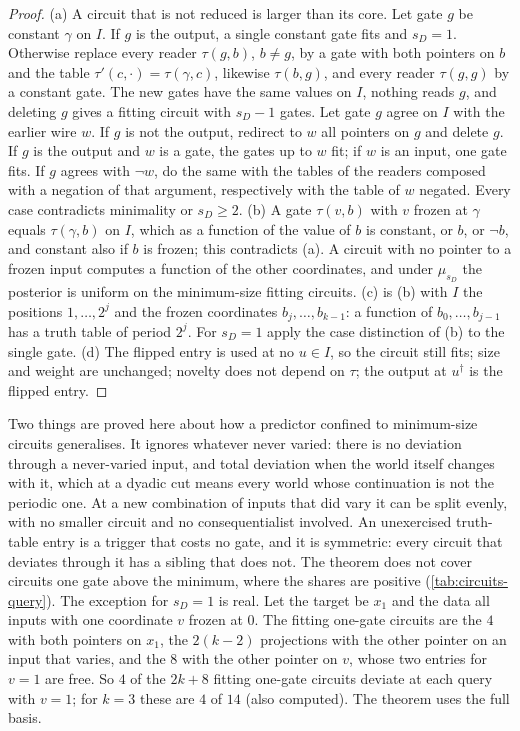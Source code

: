\begin{proof}
(a) A circuit that is not reduced is larger than its core. Let gate $g$ be constant $\gamma$ on $I$. If $g$ is
the output, a single constant gate fits and $s_D=1$. Otherwise replace every reader $\tau(g,b)$, $b\ne g$, by
a gate with both pointers on $b$ and the table $\tau'(c,\cdot)=\tau(\gamma,c)$, likewise $\tau(b,g)$, and
every reader $\tau(g,g)$ by a constant gate. The new gates have the same values on $I$, nothing reads $g$, and
deleting $g$ gives a fitting circuit with $s_D-1$ gates. Let gate $g$ agree on $I$ with the earlier wire $w$.
If $g$ is not the output, redirect to $w$ all pointers on $g$ and delete $g$. If $g$ is the output and $w$ is
a gate, the gates up to $w$ fit; if $w$ is an input, one gate fits. If $g$ agrees with $\neg w$, do the same
with the tables of the readers composed with a negation of that argument, respectively with the table of $w$
negated. Every case contradicts minimality or $s_D\ge2$. (b) A gate $\tau(v,b)$ with $v$ frozen at $\gamma$
equals $\tau(\gamma,b)$ on $I$, which as a function of the value of $b$ is constant, or $b$, or $\neg b$, and
constant also if $b$ is frozen; this contradicts (a). A circuit with no pointer to a frozen input computes a
function of the other coordinates, and under $\mu_{s_D}$ the posterior is uniform on the minimum-size fitting
circuits. (c) is (b) with $I$ the positions $1,\dots,2^j$ and the frozen coordinates $b_j,\dots,b_{k-1}$: a
function of $b_0,\dots,b_{j-1}$ has a truth table of period $2^j$. For $s_D=1$ apply the case distinction of
(b) to the single gate. (d) The flipped entry is used at no $u\in I$, so the circuit still fits; size and
weight are unchanged; novelty does not depend on $\tau$; the output at $u^\dagger$ is the flipped entry.
\end{proof}

Two things are proved here about how a predictor confined to minimum-size circuits generalises. It ignores
whatever never varied: there is no deviation through a never-varied input, and total deviation when the world
itself changes with it, which at a dyadic cut means every world whose continuation is not the periodic one. At
a new combination of inputs that did vary it can be split evenly, with no smaller circuit and no
consequentialist involved. An unexercised truth-table entry is a trigger that costs no gate, and it is
symmetric: every circuit that deviates through it has a sibling that does not. The theorem does not cover
circuits one gate above the minimum, where the shares are positive (\cref{tab:circuits-query}). The exception
for $s_D=1$ is real. Let the target be $x_1$ and the data all inputs with one coordinate $v$ frozen at $0$.
The fitting one-gate circuits are the $4$ with both pointers on $x_1$, the $2(k-2)$ projections with the other
pointer on an input that varies, and the $8$ with the other pointer on $v$, whose two entries for $v=1$ are
free. So $4$ of the $2k+8$ fitting one-gate circuits deviate at each query with $v=1$; for $k=3$ these are $4$
of $14$ (also computed). The theorem uses the full basis.

